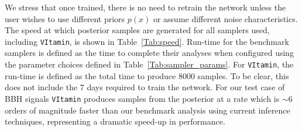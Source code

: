 We stress that once trained, there is no need to retrain the network 
unless the user wishes to use different priors $p(x)$ or assume 
different noise characteristics. The speed at which posterior 
samples are generated for all samplers used, including \texttt{VItamin}, 
is shown in Table~\ref{Tab:speed}. Run-time for the benchmark samplers is 
defined as the time to complete their analyses when configured using 
the parameter choices defined in Table~\ref{Tab:sampler_params}. 
For \texttt{VItamin}, the run-time is defined as the total time to 
produce $8000$ samples. To be clear, this does not include 
the $\mathcal{7}$ days required to train the network. For our test 
case of \ac{BBH} signals \texttt{VItamin} produces samples from the 
posterior at a rate which is $\sim 6$ orders of magnitude faster than 
our benchmark analysis using current inference techniques, 
representing a dramatic speed-up in performance.


